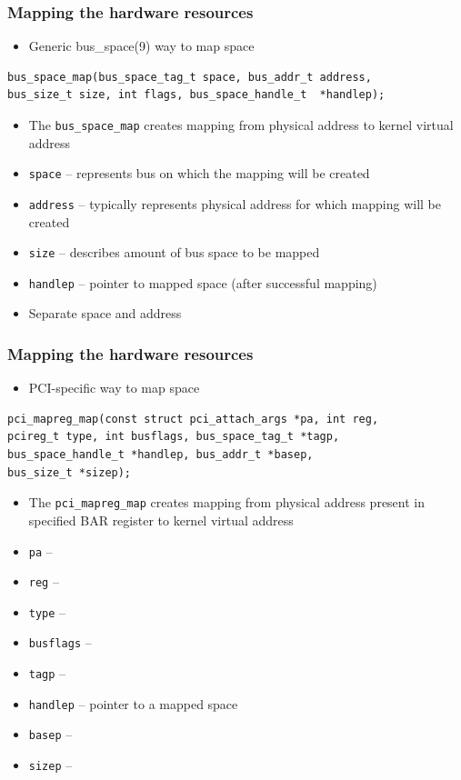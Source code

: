 \documentclass[dvipsnames,table]{beamer}
\begin{document}
\begin{frame}[fragile]
\frametitle{Mapping the hardware resources}

\begin{itemize}
	\item Generic bus\_space(9) way to map space
\end{itemize}

\begin{verbatim}
bus_space_map(bus_space_tag_t space, bus_addr_t address, 
bus_size_t size, int flags, bus_space_handle_t  *handlep);
\end{verbatim}

\begin{itemize}
	\item The {\tt bus\_space\_map} creates mapping from physical address to kernel virtual address
    \item {\tt space} -- represents bus on which the mapping will be created
    \item {\tt address} -- typically represents physical address for which mapping will be created
	\item {\tt size} -- describes amount of bus space to be mapped
	\item {\tt handlep} -- pointer to mapped space (after successful mapping)
    \item Separate space and address
\end{itemize}
\end{frame}

\begin{frame}[fragile]
\frametitle{Mapping the hardware resources}

\begin{itemize}
	\item PCI-specific way to map space
\end{itemize}

\begin{verbatim}
pci_mapreg_map(const struct pci_attach_args *pa, int reg, 
pcireg_t type, int busflags, bus_space_tag_t *tagp, 
bus_space_handle_t *handlep, bus_addr_t *basep, 
bus_size_t *sizep);
\end{verbatim}

\begin{itemize}
	\item The {\tt pci\_mapreg\_map} creates mapping from physical address present in specified BAR register to kernel virtual address
    \item {\tt pa} --
    \item {\tt reg} -- 
   	\item {\tt type} --
	\item {\tt busflags} -- 
	\item {\tt tagp} -- 
	\item {\tt handlep} -- pointer to a mapped space
	\item {\tt basep} -- 
	\item {\tt sizep} -- 
\end{itemize}
\end{frame}
\end{document}

